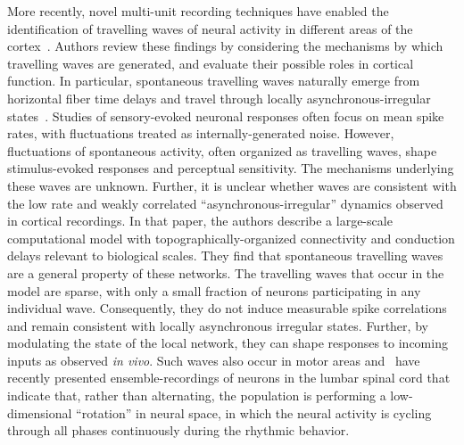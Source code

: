 \documentclass[brainsci, %
               review,submit,pdftex,moreauthors
               ]{Definitions/mdpi}
\begin{document}
More recently, novel multi-unit recording techniques have enabled the identification of travelling waves of neural activity in different areas of the cortex~\citep{muller_cortical_2018}. Authors review these findings by considering the mechanisms by which travelling waves are generated, and evaluate their possible roles in cortical function. In particular, spontaneous travelling waves naturally emerge from horizontal fiber time delays and travel through locally asynchronous-irregular states~\citep{davis_spontaneous_2021}. Studies of sensory-evoked neuronal responses often focus on mean spike rates, with fluctuations treated as internally-generated noise. However, fluctuations of spontaneous activity, often organized as travelling waves, shape stimulus-evoked responses and perceptual sensitivity. The mechanisms underlying these waves are unknown. Further, it is unclear whether waves are consistent with the low rate and weakly correlated ``asynchronous-irregular'' dynamics observed in cortical recordings. In that paper, the authors describe a large-scale computational model with topographically-organized connectivity and conduction delays relevant to biological scales. They find that spontaneous travelling waves are a general property of these networks. The travelling waves that occur in the model are sparse, with only a small fraction of neurons participating in any individual wave. Consequently, they do not induce measurable spike correlations and remain consistent with locally asynchronous irregular states. Further, by modulating the state of the local network, they can shape responses to incoming inputs as observed \textit{in vivo}. Such waves also occur in motor areas and~\citet{linden_movement_2022} have recently presented ensemble-recordings of neurons in the lumbar spinal cord that indicate that, rather than alternating, the population is performing a low-dimensional ``rotation'' in neural space, in which the neural activity is cycling through all phases continuously during the rhythmic behavior.
\end{document}
